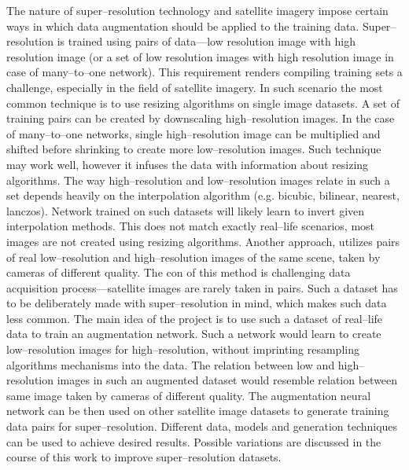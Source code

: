 The nature of super--resolution technology and satellite imagery impose certain
ways in which data augmentation should be applied to the training data.
Super--resolution is trained using pairs of data---low resolution image with
high resolution image (or a set of low resolution images with high resolution
image in case of many--to--one network).
This requirement renders compiling training sets a challenge, especially in the
field of satellite imagery.
In such scenario the most common technique is to use resizing algorithms on
single image datasets.
A set of training pairs can be created by downscaling high--resolution images.
In the case of many--to--one networks, single high--resolution image can be
multiplied and shifted before shrinking to create more low--resolution images.
Such technique may work well, however it infuses the data with information
about resizing algorithms.
The way high--resolution and low--resolution images relate in such a set
depends heavily on the interpolation algorithm (e.g. bicubic, bilinear,
nearest, lanczos).
Network trained on such datasets will likely learn to invert given
interpolation methods.
This does not match exactly real--life scenarios, most images are not created
using resizing algorithms.
Another approach, utilizes pairs of real low--resolution and high--resolution
images of the same scene, taken by cameras of different quality.
The con of this method is challenging data acquisition process---satellite
images are rarely taken in pairs.
Such a dataset has to be deliberately made with super--resolution in mind,
which makes such data less common.
The main idea of the project is to use such a dataset of real--life data to
train an augmentation network.
Such a network would learn to create low--resolution images for
high--resolution, without imprinting resampling algorithms mechanisms into the
data.
The relation between low and high--resolution images in such an augmented
dataset would resemble relation between same image taken by cameras of
different quality. 
The augmentation neural network can be then used on other satellite image
datasets to generate training data pairs for super--resolution.
Different data, models and generation techniques can be used to achieve desired
results.
Possible variations are discussed in the course of this work to improve
super--resolution datasets.
